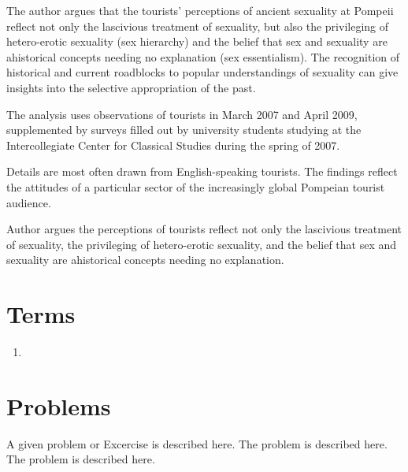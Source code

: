 The author argues that the tourists' perceptions of ancient sexuality at Pompeii reflect not only the lascivious treatment of sexuality, but also the privileging of hetero-erotic sexuality (sex hierarchy) and the belief that sex and sexuality are ahistorical concepts needing no explanation (sex essentialism). The recognition of historical and current roadblocks to popular understandings of sexuality can give insights into the selective appropriation of the past.


The analysis uses observations of tourists in March 2007 and April 2009, supplemented by surveys filled out by university students studying at the Intercollegiate Center for Classical Studies during the spring of 2007.

Details are most often drawn from English-speaking tourists. The findings reflect the attitudes of a particular sector of the increasingly global Pompeian tourist audience.


Author argues the perceptions of tourists reflect not only the lascivious treatment of sexuality, the privileging of hetero-erotic sexuality, and the belief that sex and sexuality are ahistorical concepts needing no explanation.

\section{Terms}
\label{sec:terms18}

\begin{enumerate}
	\item
\end{enumerate}


%
%
%


\section*{Problems}
%
\begin{prob}
\label{prob1}
A given problem or Excercise is described here. The
problem is described here. The problem is described here.
\end{prob}



